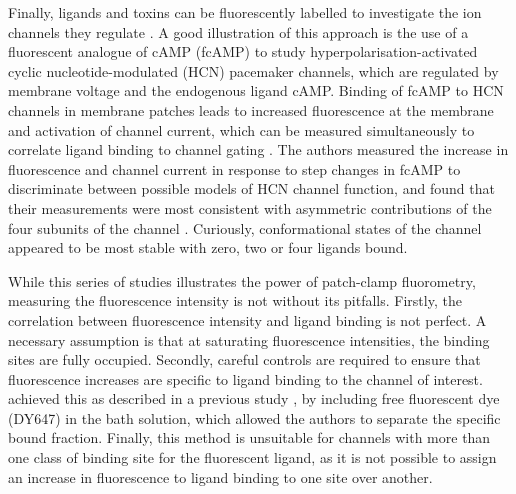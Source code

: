 Finally, ligands and toxins can be fluorescently labelled to investigate the ion channels they regulate \cite{zheng_handbook_2015, braun_current_2020}.
A good illustration of this approach is the use of a fluorescent analogue of cAMP (fcAMP) to study hyperpolarisation-activated cyclic nucleotide-modulated (HCN) pacemaker channels, which are regulated by membrane voltage and the endogenous ligand cAMP.
Binding of fcAMP to HCN channels in membrane patches leads to increased fluorescence at the membrane and activation of channel current, which can be measured simultaneously to correlate ligand binding to channel gating \cite{kusch_interdependence_2010-1, kusch_how_2012, thon_conformational_2015}.
The authors measured the increase in fluorescence and channel current in response to step changes in fcAMP to discriminate between possible models of HCN channel function, and found that their measurements were most consistent with asymmetric contributions of the four subunits of the channel \cite{kusch_how_2012}.
Curiously, conformational states of the channel appeared to be most stable with zero, two or four ligands bound.

While this series of studies illustrates the power of patch-clamp fluorometry, measuring the fluorescence intensity is not without its pitfalls.
Firstly, the correlation between fluorescence intensity and ligand binding is not perfect.
A necessary assumption is that at saturating fluorescence intensities, the binding sites are fully occupied.
Secondly, careful controls are required to ensure that fluorescence increases are specific to ligand binding to the channel of interest.
\citeauthor{kusch_interdependence_2010-1} achieved this as described in a previous study \cite{biskup_relating_2007}, by including free fluorescent dye (DY647) in the bath solution, which allowed the authors to separate the specific bound fraction.
Finally, this method is unsuitable for channels with more than one class of binding site for the fluorescent ligand, as it is not possible to assign an increase in fluorescence to ligand binding to one site over another.
